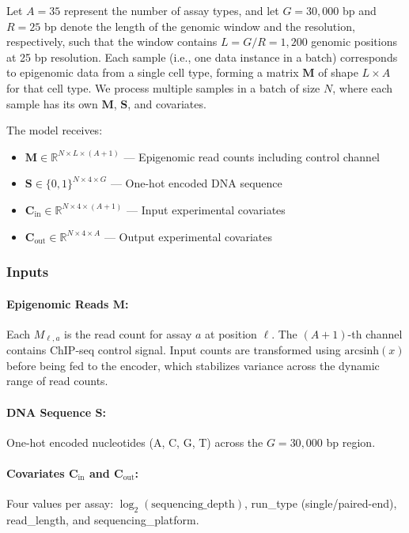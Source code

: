 Let $A = 35$ represent the number of assay types, and let $G = 30{,}000$ bp and $R = 25$ bp denote the length of the genomic window and the resolution, respectively, such that the window contains $L = G / R = 1{,}200$ genomic positions at 25 bp resolution. Each sample (i.e., one data instance in a batch) corresponds to epigenomic data from a single cell type, forming a matrix $\mathbf{M}$ of shape $L \times A$ for that cell type. We process multiple samples in a batch of size $N$, where each sample has its own $\mathbf{M}$, $\mathbf{S}$, and covariates.

The model receives:
\begin{itemize}
    \item $\mathbf{M} \in \mathbb{R}^{N \times L \times (A+1)}$ --- Epigenomic read counts including control channel
    \item $\mathbf{S} \in \{0,1\}^{N \times 4 \times G}$ --- One-hot encoded DNA sequence
    \item $\mathbf{C}_{\text{in}} \in \mathbb{R}^{N \times 4 \times (A+1)}$ --- Input experimental covariates
    \item $\mathbf{C}_{\text{out}} \in \mathbb{R}^{N \times 4 \times A}$ --- Output experimental covariates
\end{itemize}

\subsubsection{Inputs}

\paragraph{Epigenomic Reads $\mathbf{M}$:} Each $M_{\ell,a}$ is the read count for assay $a$ at position $\ell$. The $(A+1)$-th channel contains ChIP-seq control signal. Input counts are transformed using $\text{arcsinh}(x)$ before being fed to the encoder, which stabilizes variance across the dynamic range of read counts.

\paragraph{DNA Sequence $\mathbf{S}$:} One-hot encoded nucleotides (A, C, G, T) across the $G = 30{,}000$ bp region.

\paragraph{Covariates $\mathbf{C}_{\text{in}}$ and $\mathbf{C}_{\text{out}}$:} Four values per assay: $\log_2(\text{sequencing\_depth})$, run\_type (single/paired-end), read\_length, and sequencing\_platform.

